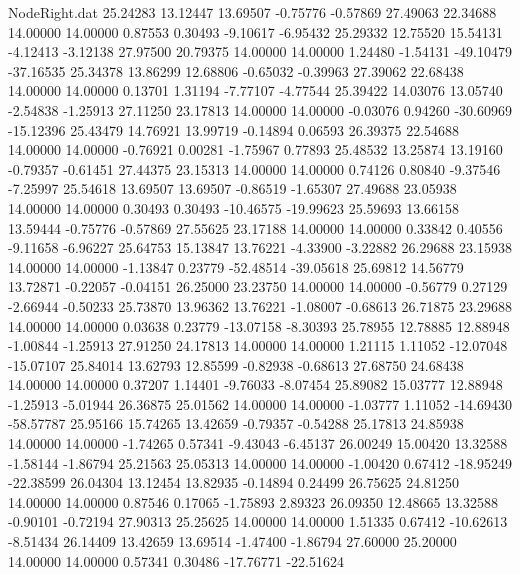 \begin{filecontents}{NodeRight.dat}
  25.24283   13.12447   13.69507    -0.75776   -0.57869   27.49063   22.34688   14.00000   14.00000    0.87553    0.30493   -9.10617   -6.95432
  25.29332   12.75520   15.54131    -4.12413   -3.12138   27.97500   20.79375   14.00000   14.00000    1.24480   -1.54131  -49.10479  -37.16535
  25.34378   13.86299   12.68806    -0.65032   -0.39963   27.39062   22.68438   14.00000   14.00000    0.13701    1.31194   -7.77107   -4.77544
  25.39422   14.03076   13.05740    -2.54838   -1.25913   27.11250   23.17813   14.00000   14.00000   -0.03076    0.94260  -30.60969  -15.12396
  25.43479   14.76921   13.99719    -0.14894    0.06593   26.39375   22.54688   14.00000   14.00000   -0.76921    0.00281   -1.75967    0.77893
  25.48532   13.25874   13.19160    -0.79357   -0.61451   27.44375   23.15313   14.00000   14.00000    0.74126    0.80840   -9.37546   -7.25997
  25.54618   13.69507   13.69507    -0.86519   -1.65307   27.49688   23.05938   14.00000   14.00000    0.30493    0.30493  -10.46575  -19.99623
  25.59693   13.66158   13.59444    -0.75776   -0.57869   27.55625   23.17188   14.00000   14.00000    0.33842    0.40556   -9.11658   -6.96227
  25.64753   15.13847   13.76221    -4.33900   -3.22882   26.29688   23.15938   14.00000   14.00000   -1.13847    0.23779  -52.48514  -39.05618
  25.69812   14.56779   13.72871    -0.22057   -0.04151   26.25000   23.23750   14.00000   14.00000   -0.56779    0.27129   -2.66944   -0.50233
  25.73870   13.96362   13.76221    -1.08007   -0.68613   26.71875   23.29688   14.00000   14.00000    0.03638    0.23779  -13.07158   -8.30393
  25.78955   12.78885   12.88948    -1.00844   -1.25913   27.91250   24.17813   14.00000   14.00000    1.21115    1.11052  -12.07048  -15.07107
  25.84014   13.62793   12.85599    -0.82938   -0.68613   27.68750   24.68438   14.00000   14.00000    0.37207    1.14401   -9.76033   -8.07454
  25.89082   15.03777   12.88948    -1.25913   -5.01944   26.36875   25.01562   14.00000   14.00000   -1.03777    1.11052  -14.69430  -58.57787
  25.95166   15.74265   13.42659    -0.79357   -0.54288   25.17813   24.85938   14.00000   14.00000   -1.74265    0.57341   -9.43043   -6.45137
  26.00249   15.00420   13.32588    -1.58144   -1.86794   25.21563   25.05313   14.00000   14.00000   -1.00420    0.67412  -18.95249  -22.38599
  26.04304   13.12454   13.82935    -0.14894    0.24499   26.75625   24.81250   14.00000   14.00000    0.87546    0.17065   -1.75893    2.89323
  26.09350   12.48665   13.32588    -0.90101   -0.72194   27.90313   25.25625   14.00000   14.00000    1.51335    0.67412  -10.62613   -8.51434
  26.14409   13.42659   13.69514    -1.47400   -1.86794   27.60000   25.20000   14.00000   14.00000    0.57341    0.30486  -17.76771  -22.51624

\end{filecontents}
